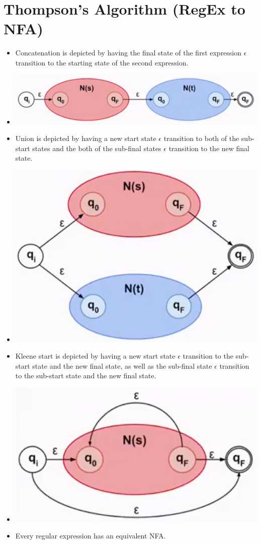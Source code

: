 \documentclass[12pt]{article}
\begin{document}
\section{Thompson's Algorithm (RegEx to NFA)}
\begin{itemize}
    \item Concatenation is depicted by having the final state of the first expression $\epsilon$ transition to the starting state of the second expression.
    \item[] \includegraphics[width=0.9\linewidth]{images/thompson-concatenation.png}
    \item Union is depicted by having a new start state $\epsilon$ transition to both of the sub-start states and the both of the sub-final states $\epsilon$ transition to the new final state.
    \item[] \includegraphics[width=0.6\linewidth]{images/thompson-union.png}
    \item Kleene start is depicted by having a new start state $\epsilon$ transition to the sub-start state and the new final state, as well as the sub-final state $\epsilon$ transition to the sub-start state and the new final state.
    \item[] \includegraphics[width=0.6\linewidth]{images/thompson-kleene.png}
    \item Every regular expression has an equivalent NFA.
\end{itemize}
\end{document}
